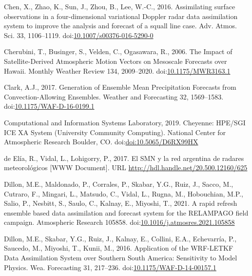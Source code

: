 \documentclass[final,5p,times,twocolumn,authoryear]{elsarticle} %
\begin{document}
\leavevmode\hypertarget{ref-chen2016}{}%
Chen, X., Zhao, K., Sun, J., Zhou, B., Lee, W.-C., 2016. Assimilating surface observations in a four-dimensional variational Doppler radar data assimilation system to improve the analysis and forecast of a squall line case. Adv. Atmos. Sci. 33, 1106--1119. doi:\href{https://doi.org/10.1007/s00376-016-5290-0}{10.1007/s00376-016-5290-0}

\leavevmode\hypertarget{ref-cherubini2006}{}%
Cherubini, T., Businger, S., Velden, C., Ogasawara, R., 2006. The Impact of Satellite-Derived Atmospheric Motion Vectors on Mesoscale Forecasts over Hawaii. Monthly Weather Review 134, 2009--2020. doi:\href{https://doi.org/10.1175/MWR3163.1}{10.1175/MWR3163.1}

\leavevmode\hypertarget{ref-clark2017}{}%
Clark, A.J., 2017. Generation of Ensemble Mean Precipitation Forecasts from Convection-Allowing Ensembles. Weather and Forecasting 32, 1569--1583. doi:\href{https://doi.org/10.1175/WAF-D-16-0199.1}{10.1175/WAF-D-16-0199.1}

\leavevmode\hypertarget{ref-Cheyenne2019}{}%
Computational and Information Systems Laboratory, 2019. Cheyenne: HPE/SGI ICE XA System (University Community Computing). National Center for Atmospheric Research Boulder, CO. doi:\href{https://doi.org/doi:10.5065/D6RX99HX}{doi:10.5065/D6RX99HX}

\leavevmode\hypertarget{ref-deelia2017}{}%
de Elía, R., Vidal, L., Lohigorry, P., 2017. El SMN y la red argentina de radares meteorológicos {[}WWW Document{]}. URL \url{http://hdl.handle.net/20.500.12160/625}

\leavevmode\hypertarget{ref-dillon2021}{}%
Dillon, M.E., Maldonado, P., Corrales, P., Skabar, Y.G., Ruiz, J., Sacco, M., Cutraro, F., Mingari, L., Matsudo, C., Vidal, L., Rugna, M., Hobouchian, M.P., Salio, P., Nesbitt, S., Saulo, C., Kalnay, E., Miyoshi, T., 2021. A rapid refresh ensemble based data assimilation and forecast system for the RELAMPAGO field campaign. Atmospheric Research 105858. doi:\href{https://doi.org/10.1016/j.atmosres.2021.105858}{10.1016/j.atmosres.2021.105858}

\leavevmode\hypertarget{ref-dillon2016}{}%
Dillon, M.E., Skabar, Y.G., Ruiz, J., Kalnay, E., Collini, E.A., Echevarría, P., Saucedo, M., Miyoshi, T., Kunii, M., 2016. Application of the WRF-LETKF Data Assimilation System over Southern South America: Sensitivity to Model Physics. Wea. Forecasting 31, 217--236. doi:\href{https://doi.org/10.1175/WAF-D-14-00157.1}{10.1175/WAF-D-14-00157.1}
\end{document}

